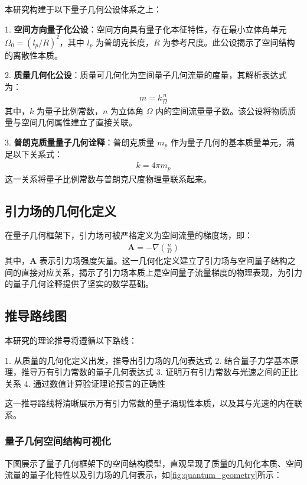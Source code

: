\documentclass[12pt,twocolumn]{article}
\begin{document}
本研究构建于以下量子几何公设体系之上：

1. \textbf{空间方向量子化公设}：空间方向具有量子化本征特性，存在最小立体角单元 $\Omega_0 = (l_p/R)^2$，其中 $l_p$ 为普朗克长度，$R$ 为参考尺度。此公设揭示了空间结构的离散性本质。

2. \textbf{质量几何化公设}：质量可几何化为空间量子几何流量的度量，其解析表达式为：
\begin{align}
    m = k \frac{n}{\Omega}
\end{align}
其中，$k$ 为量子比例常数，$n$ 为立体角 $\Omega$ 内的空间流量量子数。该公设将物质质量与空间几何属性建立了直接关联。

3. \textbf{普朗克质量量子几何诠释}：普朗克质量 $m_p$ 作为量子几何的基本质量单元，满足以下关系式：
\begin{align}
    k = 4\pi m_p
\end{align}这一关系将量子比例常数与普朗克尺度物理量联系起来。

\subsection{引力场的几何化定义}

在量子几何框架下，引力场可被严格定义为空间流量的梯度场，即：
\begin{align}
    \mathbf{A} = -\nabla\left(\frac{n}{\Omega}\right)
\end{align}
其中，$\mathbf{A}$ 表示引力场强度矢量。这一几何化定义建立了引力场与空间量子结构之间的直接对应关系，揭示了引力场本质上是空间量子流量梯度的物理表现，为引力的量子几何诠释提供了坚实的数学基础。

\subsection{推导路线图}

本研究的理论推导将遵循以下路线：

1. 从质量的几何化定义出发，推导出引力场的几何表达式
2. 结合量子力学基本原理，推导万有引力常数的量子几何表达式
3. 证明万有引力常数与光速之间的正比关系
4. 通过数值计算验证理论预言的正确性

这一推导路线将清晰展示万有引力常数的量子涌现性本质，以及其与光速的内在联系。

\subsubsection{量子几何空间结构可视化}

下图展示了量子几何框架下的空间结构模型，直观呈现了质量的几何化本质、空间流量的量子化特性以及引力场的几何表示，如\autoref{fig:quantum_geometry}所示：
\end{document}
